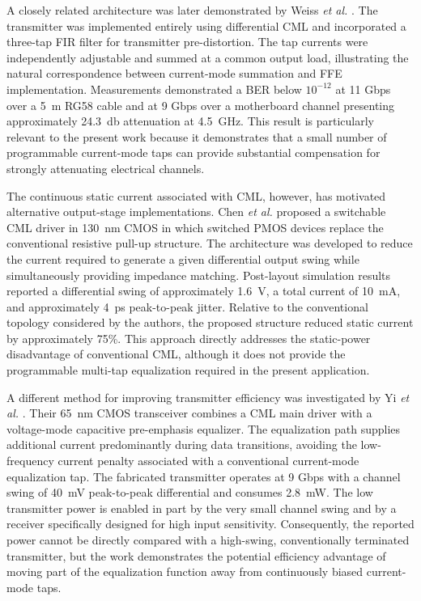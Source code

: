 A closely related architecture was later demonstrated by Weiss \textit{et al.} \cite{weiss2006}. The transmitter was implemented entirely using differential \ac{CML} and incorporated a three-tap \ac{FIR} filter for transmitter pre-distortion. The tap currents were independently adjustable and summed at a common output load, illustrating the natural correspondence between current-mode summation and \ac{FFE} implementation. Measurements demonstrated a \ac{BER} below $10^{-12}$ at 11 Gbps over a \SI{5}{\meter} RG58 cable and at 9 Gbps over a motherboard channel presenting approximately \SI{24.3}{\decibel} attenuation at \SI{4.5}{\giga\hertz}. This result is particularly relevant to the present work because it demonstrates that a small number of programmable current-mode taps can provide substantial compensation for strongly attenuating electrical channels.

The continuous static current associated with \ac{CML}, however, has motivated alternative output-stage implementations. Chen \textit{et al.} \cite{chen_switchable_cml_2016} proposed a switchable \ac{CML} driver in \SI{130}{\nano\meter} \ac{CMOS} in which switched PMOS devices replace the conventional resistive pull-up structure. The architecture was developed to reduce the current required to generate a given differential output swing while simultaneously providing impedance matching. Post-layout simulation results reported a differential swing of approximately \SI{1.6}{\volt}, a total current of \SI{10}{\milli\ampere}, and approximately \SI{4}{\pico\second} peak-to-peak jitter. Relative to the conventional topology considered by the authors, the proposed structure reduced static current by approximately 75\%. This approach directly addresses the static-power disadvantage of conventional \ac{CML}, although it does not provide the programmable multi-tap equalization required in the present application.

A different method for improving transmitter efficiency was investigated by Yi \textit{et al.} \cite{yi2016}. Their \SI{65}{\nano\meter} \ac{CMOS} transceiver combines a \ac{CML} main driver with a voltage-mode capacitive pre-emphasis equalizer. The equalization path supplies additional current predominantly during data transitions, avoiding the low-frequency current penalty associated with a conventional current-mode equalization tap. The fabricated transmitter operates at 9 Gbps with a channel swing of \SI{40}{\milli\volt} peak-to-peak differential and consumes \SI{2.8}{\milli\watt}. The low transmitter power is enabled in part by the very small channel swing and by a receiver specifically designed for high input sensitivity. Consequently, the reported power cannot be directly compared with a high-swing, conventionally terminated transmitter, but the work demonstrates the potential efficiency advantage of moving part of the equalization function away from continuously biased current-mode taps.

